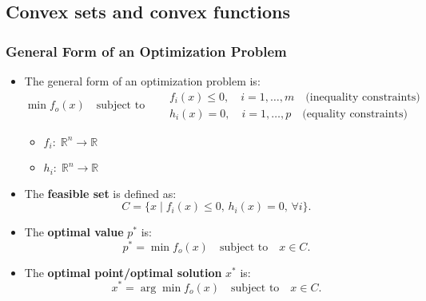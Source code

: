 \subsection{Convex sets and convex functions}
\subsubsection{General Form of an Optimization Problem}
\begin{definition}
    \begin{itemize}
        \item The general form of an optimization problem is:
        \[
        \min f_o(x) \quad \text{subject to} \quad 
        \begin{aligned}
            &f_i(x) \leq 0, \quad i = 1, \ldots, m \quad \text{(inequality constraints)} \\
            &h_i(x) = 0, \quad i = 1, \ldots, p \quad \text{(equality constraints)} 
        \end{aligned}
        \]
        \begin{itemize}
            \item $f_i: \; \mathbb{R}^n \rightarrow \mathbb{R}$
            \item $h_i: \; \mathbb{R}^n \rightarrow \mathbb{R}$
        \end{itemize}
    
        \item The \textbf{feasible set} is defined as:
        \[
        C = \{x \mid f_i(x) \leq 0, \, h_i(x) = 0, \, \forall i \}.
        \]
    
        \item The \textbf{optimal value} $p^*$ is:
        \[
        p^* = \min f_o(x) \quad \text{subject to} \quad x \in C.
        \]
    
        \item The \textbf{optimal point/optimal solution} $x^*$ is:
        \[
        x^* = \arg \min f_o(x) \quad \text{subject to} \quad x \in C.
        \]
    \end{itemize}
\end{definition}

